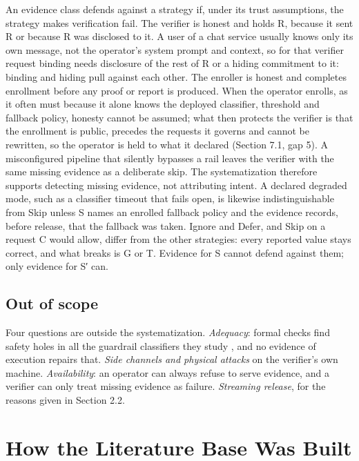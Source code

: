 \documentclass[11pt]{article}
\begin{document}
An evidence class defends against a strategy if, under its trust assumptions, the strategy makes verification fail. The verifier is honest and holds R, because it sent R or because R was disclosed to it. A user of a chat service usually knows only its own message, not the operator's system prompt and context, so for that verifier request binding needs disclosure of the rest of R or a hiding commitment to it: binding and hiding pull against each other. The enroller is honest and completes enrollment before any proof or report is produced. When the operator enrolls, as it often must because it alone knows the deployed classifier, threshold and fallback policy, honesty cannot be assumed; what then protects the verifier is that the enrollment is public, precedes the requests it governs and cannot be rewritten, so the operator is held to what it declared (Section 7.1, gap 5). A misconfigured pipeline that silently bypasses a rail leaves the verifier with the same missing evidence as a deliberate skip. The systematization therefore supports detecting missing evidence, not attributing intent. A declared degraded mode, such as a classifier timeout that fails open, is likewise indistinguishable from Skip unless S names an enrolled fallback policy and the evidence records, before release, that the fallback was taken. Ignore and Defer, and Skip on a request C would allow, differ from the other strategies: every reported value stays correct, and what breaks is G or T. Evidence for S cannot defend against them; only evidence for S′ can.

\subsection{Out of scope}

Four questions are outside the systematization. \emph{Adequacy}: formal checks find safety holes in all the guardrail classifiers they study \cite{E2}, and no evidence of execution repairs that. \emph{Side channels and physical attacks} on the verifier's own machine. \emph{Availability}: an operator can always refuse to serve evidence, and a verifier can only treat missing evidence as failure. \emph{Streaming release}, for the reasons given in Section 2.2.

\section{How the Literature Base Was Built}
\end{document}
